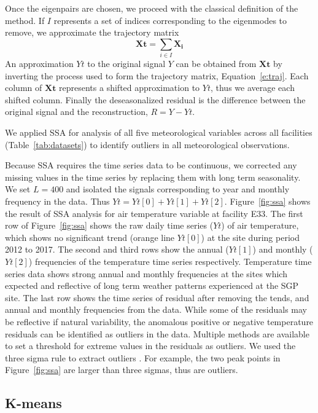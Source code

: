 Once the eigenpairs are chosen, we proceed with the classical definition
of the method. If $I$ represents a set of indices corresponding to the
eigenmodes to remove, we approximate the trajectory matrix
%
\begin{equation*}
    \mathbf{Xt} = \sum_{i\in I} \mathbf{X_i}
\end{equation*}
%
An approximation $Yt$ to the original signal $Y$ can be obtained from
$\mathbf{Xt}$ by inverting the process used to form the trajectory
matrix, Equation~\eqref{e:traj}. Each column of $\mathbf{Xt}$ represents
a shifted approximation to $Yt$, thus we average each shifted column.
Finally the deseasonalized residual is the difference between the
original signal and the reconstruction, $R=Y-Yt$.

We applied SSA for analysis of all five meteorological variables across
all facilities (Table~\ref{tab:datasets}) to identify outliers in all
meteorological observations.

Because SSA requires the time series data to be continuous, 
we corrected any missing values in the time series by replacing them
with long term seasonality. 
We set $L = 400$ and isolated the signals corresponding to year and
monthly frequency in the data.
Thus $Yt = Yt[0] + Yt[1] + Yt[2]$.
Figure~\ref{fig:ssa} shows the result of SSA analysis for
air temperature variable at facility E33. The first row of
Figure~\ref{fig:ssa} shows the raw daily time series ($Yt$) of
air temperature, which shows no significant trend (orange line
$Yt[0]$) at the site during period 2012 to 2017.
The second and third rows show the annual ($Yt[1]$) and monthly
($Yt[2]$) frequencies of the temperature time series respectively. 
Temperature time series data shows strong annual and monthly frequencies
at the sites which expected and reflective of long term weather patterns
experienced at the SGP site. 
The last row shows the time series of residual after removing the tends,
and annual and monthly frequencies from the data. While some of the
residuals may be reflective if natural variability, the
anomalous positive or negative temperature residuals can be identified
as outliers in the data. Multiple methods are available to set a threshold 
for extreme values in the residuals as outliers. We used the three sigma 
rule to extract outliers \cite{pukelsheim1994three}. For example, the two
peak points in Figure~\ref{fig:ssa} are larger than three sigmas, 
thus are outliers.

\subsection{K-means}

